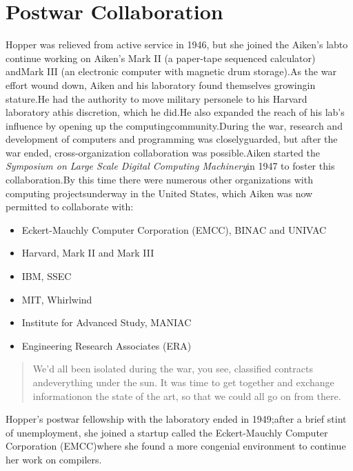 \section{Postwar Collaboration}
Hopper was relieved from active service in 1946, but she joined the Aiken's
labto continue working on Aiken's Mark II (a paper-tape sequenced calculator)
andMark III (an electronic computer with magnetic drum storage).As the war
effort wound down, Aiken and his laboratory found themselves growingin
stature.He had the authority to move military personele to his Harvard
laboratory athis discretion, which he did.He also expanded the reach of his
lab's influence by opening up the computingcommunity.During the war, research
and development of computers and programming was closelyguarded, but after the
war ended, cross-organization collaboration was possible.Aiken started the
\textit{Symposium on Large Scale Digital Computing Machinery}in 1947 to foster
this collaboration.By this time there were numerous other organizations with
computing projectsunderway in the United States, which Aiken was now permitted
to collaborate with:
\begin{itemize}
    \item Eckert-Mauchly Computer Corporation (EMCC), BINAC and UNIVAC
    \item Harvard, Mark II and Mark III
    \item IBM, SSEC
    \item MIT, Whirlwind
    \item Institute for Advanced Study, MANIAC
    \item Engineering Research Associates (ERA)

\end{itemize}
\begin{quotation}
    We'd all been isolated during the war, you see, classified contracts andeverything under the sun. It was time to get together and exchange informationon the state of the art, so that we could all go on from there.
\end{quotation}
Hopper's postwar fellowship with the laboratory ended in 1949;after a brief stint of unemployment, she joined a startup called the Eckert-Mauchly Computer Corporation (EMCC)where she found a more congenial environment to continue her work on compilers.
